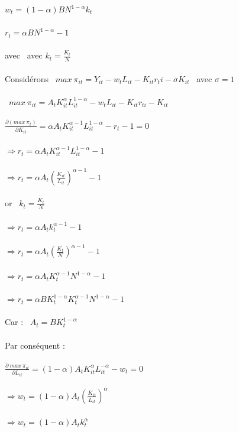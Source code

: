 \documentclass[11pt,twoside,a4paper]{article}
\begin{document}
$w_t=(1-\alpha)BN^{1-\alpha}k_t$\\ \\
$r_t=\alpha BN^{1-\alpha}-1$\\ \\
avec \ avec $k_t=\frac{K_t}{N}$\\ \\
Considérons  \ $ max\ \pi_{it}= Y_{it} -w_tL_{it}-K_{it} r_ti-\sigma K_{it} $ \ avec $\sigma=1$\\ \\
\ $ max\ \pi_{it}= A_tK^{\alpha}_{it}L^{1-\alpha}_{it} -w_tL_{it}-K_{it} r_{ti} -K_{it} $ \\ \\
 $ \frac{\partial (max\ \pi_t)}{\partial K_{it}}=\alpha A_tK^{\alpha-1}_{it}L^{1-\alpha}_{it}-r_t-1 = 0 $\\ \\
 $ \Rightarrow r_t=\alpha A_tK^{\alpha-1}_{it}L^{1-\alpha}_{it} -1$\\ \\
 $ \Rightarrow r_t=\alpha A_t \left(\frac{K_{it}}{L_{it}}\right)^{\alpha-1} -1$\\ \\ or \ $k_t=\frac{K_t}{N}$\\ \\
 $ \Rightarrow r_t=\alpha A_t k_t^{\alpha-1} -1$\\ \\ 
 $ \Rightarrow r_t=\alpha A_t \left(\frac{K_t}{N}\right)^{\alpha-1} -1$\\ \\ 
 $ \Rightarrow r_t=\alpha A_t K_t^{\alpha-1}N^{1-\alpha} -1$\\ \\ 
$ \Rightarrow r_t=\alpha BK^{1-\alpha}_t K_t^{\alpha-1}N^{1-\alpha} -1$\\ \\ 
Car : \ $A_t=BK^{1-\alpha}_t$\\ \\
 Par conséquent : \ \\ \\ 
$\frac{\partial\ max\ \pi_{it} }{\partial L_{it}}=(1-\alpha)A_tK_{it}^{\alpha}L_{it}^{-\alpha}-w_t=0$\\ \\
$ \Rightarrow w_t=(1-\alpha)A_t\left(\frac{K_{it}}{L_{it}}\right)^{\alpha}$\\ \\
$ \Rightarrow w_t=(1-\alpha)A_tk_t^{\alpha}$\\ \\
\end{document}
